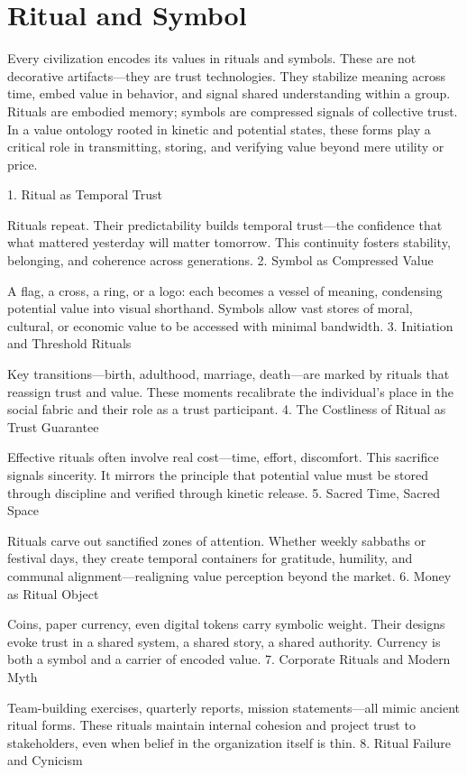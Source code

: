 \documentclass[11pt,oneside]{book}
\begin{document}
\chapter{ Ritual and Symbol}

Every civilization encodes its values in rituals and symbols. These are not decorative artifacts—they are trust technologies. They stabilize meaning across time, embed value in behavior, and signal shared understanding within a group. Rituals are embodied memory; symbols are compressed signals of collective trust. In a value ontology rooted in kinetic and potential states, these forms play a critical role in transmitting, storing, and verifying value beyond mere utility or price.

1. Ritual as Temporal Trust

Rituals repeat. Their predictability builds temporal trust—the confidence that what mattered yesterday will matter tomorrow. This continuity fosters stability, belonging, and coherence across generations.
2. Symbol as Compressed Value

A flag, a cross, a ring, or a logo: each becomes a vessel of meaning, condensing potential value into visual shorthand. Symbols allow vast stores of moral, cultural, or economic value to be accessed with minimal bandwidth.
3. Initiation and Threshold Rituals

Key transitions—birth, adulthood, marriage, death—are marked by rituals that reassign trust and value. These moments recalibrate the individual’s place in the social fabric and their role as a trust participant.
4. The Costliness of Ritual as Trust Guarantee

Effective rituals often involve real cost—time, effort, discomfort. This sacrifice signals sincerity. It mirrors the principle that potential value must be stored through discipline and verified through kinetic release.
5. Sacred Time, Sacred Space

Rituals carve out sanctified zones of attention. Whether weekly sabbaths or festival days, they create temporal containers for gratitude, humility, and communal alignment—realigning value perception beyond the market.
6. Money as Ritual Object

Coins, paper currency, even digital tokens carry symbolic weight. Their designs evoke trust in a shared system, a shared story, a shared authority. Currency is both a symbol and a carrier of encoded value.
7. Corporate Rituals and Modern Myth

Team-building exercises, quarterly reports, mission statements—all mimic ancient ritual forms. These rituals maintain internal cohesion and project trust to stakeholders, even when belief in the organization itself is thin.
8. Ritual Failure and Cynicism
\end{document}
